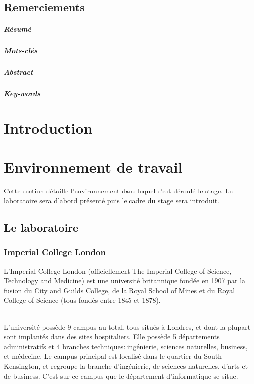 \documentclass[10pt]{report}
\begin{document}
\section*{Remerciements}\newpage
\paragraph*{Résumé} %
\paragraph*{Mots-clés}
\paragraph*{Abstract}
\paragraph*{Key-words}

\renewcommand\contentsname{Sommaire}
\tableofcontents

\newpage

\chapter*{Introduction}

\chapter{Environnement de travail} 
	Cette section détaille l'environnement dans lequel s'est déroulé le stage. Le laboratoire sera d'abord présenté puis le cadre du stage sera introduit.
	\section{Le laboratoire}
	
	\subsection{Imperial College London} %
	L’Imperial College London (officiellement The Imperial College of Science, Technology and Medicine) est une université britannique fondée en 1907 par la fusion du City and Guilds College, de la Royal School of Mines et du Royal College of Science (tous fondés entre 1845 et 1878).\\ ~\par
    L'université possède 9 campus au total, tous situés à Londres, et dont la plupart sont implantés dans des sites hospitaliers.  
    Elle possède 5 départements administratifs et 4 branches techniques: ingénierie, sciences naturelles, business, et médecine.	Le campus principal est localisé dans le quartier du South Kensington, et regroupe la branche d'ingénierie, de sciences naturelles, d'arts et de business. C'est sur ce campus que le département d'informatique se situe. 
    
\end{document}
